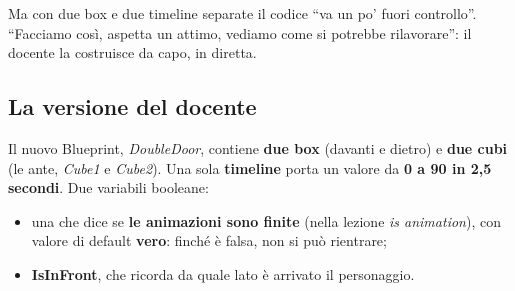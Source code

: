 Ma con due box e due timeline separate il codice ``va un po' fuori controllo''.
``Facciamo così, aspetta un attimo, vediamo come si potrebbe rilavorare'': il
docente la costruisce da capo, in diretta.

\subsection{La versione del docente}

Il nuovo Blueprint, \emph{DoubleDoor}, contiene \textbf{due box} (davanti e
dietro) e \textbf{due cubi} (le ante, \emph{Cube1} e \emph{Cube2}). Una sola
\textbf{timeline} porta un valore da \textbf{0 a 90 in 2,5 secondi}. Due
variabili booleane:
\begin{itemize}
  \item una che dice se \textbf{le animazioni sono finite} (nella lezione
        \emph{is animation}), con valore di default \textbf{vero}: finché è
        falsa, non si può rientrare;
  \item \textbf{IsInFront}, che ricorda da quale lato è arrivato il
        personaggio.
\end{itemize}

